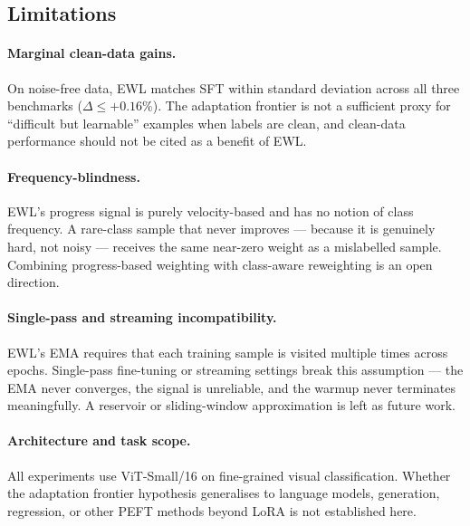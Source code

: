 \subsection{Limitations}

\paragraph{Marginal clean-data gains.}
On noise-free data, EWL matches SFT within standard deviation across all three
benchmarks ($\Delta \leq +0.16\%$).
The adaptation frontier is not a sufficient proxy for ``difficult but
learnable'' examples when labels are clean, and clean-data performance should
not be cited as a benefit of EWL.

\paragraph{Frequency-blindness.}
EWL's progress signal is purely velocity-based and has no notion of class
frequency.
A rare-class sample that never improves --- because it is genuinely hard, not
noisy --- receives the same near-zero weight as a mislabelled sample.
Combining progress-based weighting with class-aware reweighting is an open
direction.

\paragraph{Single-pass and streaming incompatibility.}
EWL's EMA requires that each training sample is visited multiple times across
epochs.
Single-pass fine-tuning or streaming settings break this assumption --- the
EMA never converges, the signal is unreliable, and the warmup never terminates
meaningfully.
A reservoir or sliding-window approximation is left as future work.

\paragraph{Architecture and task scope.}
All experiments use ViT-Small/16 on fine-grained visual classification.
Whether the adaptation frontier hypothesis generalises to language models,
generation, regression, or other PEFT methods beyond LoRA is not established
here.
